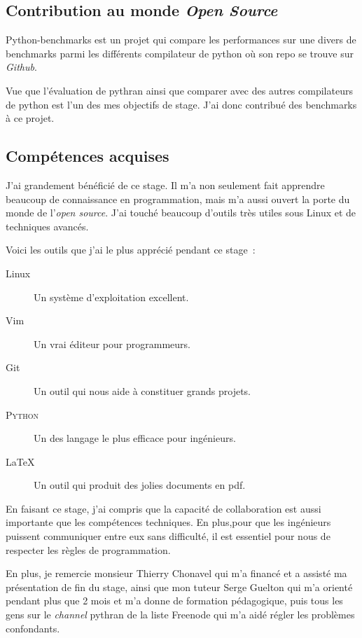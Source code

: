 \documentclass[a4paper, 11pt]{article}
\newcommand\Python{\textsc{Python}}
\begin{document}
\subsection*{Contribution au monde \emph{Open Source}}
Python-benchmarks \cite{python-benchmarks} est un projet qui compare les performances sur une divers de
benchmarks parmi les différents compilateur de python où son repo se trouve 
sur \emph{Github}.

Vue que l'évaluation de pythran ainsi que comparer avec des autres compilateurs
de python est l'un des mes objectifs de stage. J'ai donc contribué des
benchmarks à ce projet.


\subsection*{Compétences acquises}

J'ai grandement bénéficié de ce stage. Il m'a non seulement fait
apprendre beaucoup de connaissance en programmation, mais m'a aussi ouvert la
porte du monde de l'\emph{open source}. J'ai touché beaucoup d'outils très utiles sous Linux et de
techniques avancés.

Voici les outils que j'ai le plus apprécié pendant ce stage~:

\begin{description}
  \item[Linux] \hfill
    Un système d'exploitation excellent.
  \item[Vim] \hfill
    Un vrai éditeur pour programmeurs.
  \item[Git] \hfill
    Un outil qui nous aide à constituer grands projets.
  \item[\Python{}] \hfill
    Un des langage le plus efficace pour ingénieurs.
  \item[\LaTeX] \hfill
    Un outil qui produit des jolies documents en pdf.
\end{description}

En faisant ce stage, j'ai compris que la capacité de collaboration 
est aussi importante que les compétences techniques. En plus,pour que les
ingénieurs puissent communiquer entre eux sans difficulté, il est essentiel pour
nous de respecter les règles de programmation.

En plus, je remercie monsieur Thierry Chonavel qui m'a financé et a assisté ma
présentation de fin du stage, ainsi que mon tuteur Serge Guelton qui m'a orienté
pendant plus que 2 mois et m'a donne de formation pédagogique, puis tous les
gens sur le \emph{channel} pythran de la liste Freenode qui m'a aidé régler les
problèmes confondants.
\end{document}
